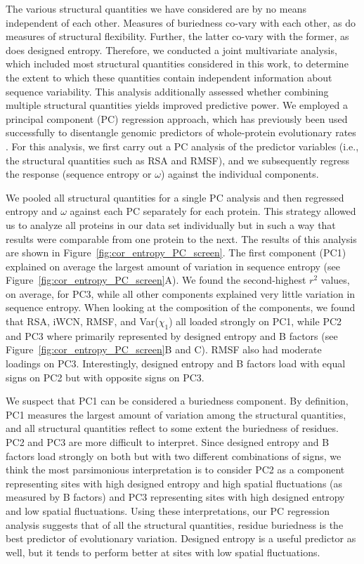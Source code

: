 \documentclass[smallextended]{svjour3}
\begin{document}
The various structural quantities we have considered are by no means independent of each other. Measures of buriedness co-vary with each other, as do measures of structural flexibility. Further, the latter co-vary with the former, as does designed entropy. Therefore, we conducted a joint multivariate analysis, which included most structural quantities considered in this work, to determine the extent to which these quantities contain independent information about sequence variability. This analysis additionally assessed whether combining multiple structural quantities yields improved predictive power. We employed a principal component (PC) regression approach, which has previously been used successfully to disentangle genomic predictors of whole-protein evolutionary rates \citep{Drummondetal2006,Bloometal2006}. For this analysis, we first carry out a PC analysis of the predictor variables (i.e., the structural quantities such as RSA and RMSF), and we subsequently regress the response (sequence entropy or $\omega$) against the individual components.

We pooled all structural quantities for a single PC analysis and then regressed entropy and $\omega$ against each PC separately for each protein. This strategy allowed us to analyze all proteins in our data set individually but in such a way that results were comparable from one protein to the next. The results of this analysis are shown in Figure~\ref{fig:cor_entropy_PC_screen}. The first component (PC1) explained on average the largest amount of variation in sequence entropy (see Figure~\ref{fig:cor_entropy_PC_screen}A). We found the second-highest $r^2$ values, on average, for PC3, while all other components explained very little variation in sequence entropy. When looking at the composition of the components, we found that RSA, iWCN, RMSF, and Var($\chi_1$) all loaded strongly on PC1, while PC2 and PC3 where primarily represented by designed entropy and B factors (see Figure~\ref{fig:cor_entropy_PC_screen}B and C). RMSF also had moderate loadings on PC3. Interestingly, designed entropy and B factors load with equal signs on PC2 but with opposite signs on PC3.

We suspect that PC1 can be considered a buriedness component. By definition, PC1 measures the largest amount of variation among the structural quantities, and all structural quantities reflect to some extent the buriedness of residues. PC2 and PC3 are more difficult to interpret. Since designed entropy and B factors load strongly on both but with two different combinations of signs, we think the most parsimonious interpretation is to consider PC2 as a component representing sites with high designed entropy and high spatial fluctuations (as measured by B factors) and PC3 representing sites with high designed entropy and low spatial fluctuations. Using these interpretations, our PC regression analysis suggests that of all the structural quantities, residue buriedness is the best predictor of evolutionary variation. Designed entropy is a useful predictor as well, but it tends to perform better at sites with low spatial fluctuations.
\end{document}
